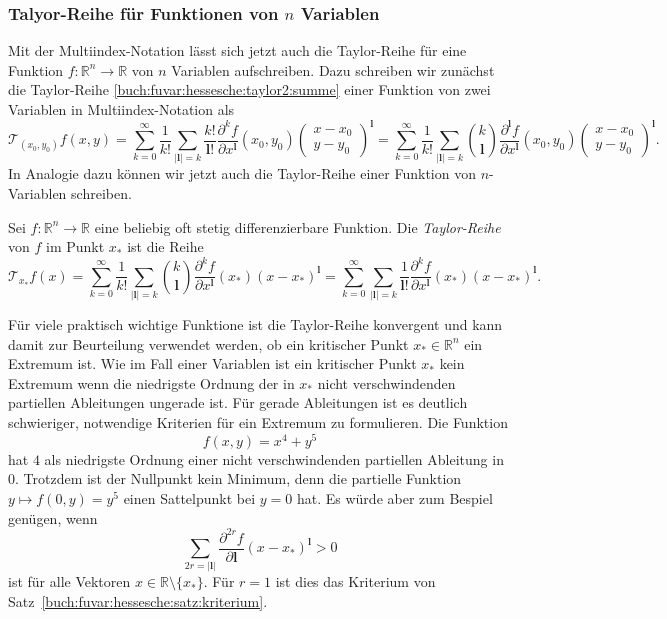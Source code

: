 \subsubsection{Talyor-Reihe für Funktionen von $n$ Variablen}
Mit der Multiindex-Notation lässt sich jetzt auch die Taylor-Reihe
für eine Funktion $f\colon\mathbb{R}^n\to\mathbb{R}$ von $n$ Variablen
aufschreiben.
Dazu schreiben wir zunächst die Taylor-Reihe
\eqref{buch:fuvar:hessesche:taylor2:summe}
einer Funktion von zwei Variablen in Multiindex-Notation als
\[
\mathscr{T}_{(x_0,y_0)}f(x,y)
=
\sum_{k=0}^\infty
\frac{1}{k!}
\sum_{|\mathbf{l}|=k}
\frac{k!}{\mathbf{l}!}
\frac{\partial^k f}{\partial x^{\mathbf{l}}}
(x_0,y_0)
\begin{pmatrix}
x-x_0\\
y-y_0
\end{pmatrix}^{\mathbf{l}}
=
\sum_{k=0}^\infty
\frac{1}{k!}
\sum_{|\mathbf{l}|=k}
\binom{k}{\mathbf{l}}
\frac{\partial^{\mathbf{l}} f}{\partial x^{\mathbf{l}}}(x_0,y_0)
\begin{pmatrix}
x-x_0\\
y-y_0
\end{pmatrix}^{\mathbf{l}}.
\]
In Analogie dazu können wir jetzt auch die Taylor-Reihe einer Funktion
von $n$-Variablen schreiben.

\begin{definition}
Sei $f\colon\mathbb{R}^n\to\mathbb{R}$ eine beliebig oft stetig
differenzierbare Funktion.
Die {\em Taylor-Reihe} von $f$ im Punkt $x_*$ ist die Reihe
\[
\mathscr{T}_{x_*} f(x)
=
\sum_{k=0}^\infty
\frac{1}{k!}
\sum_{|\mathbf{l}|=k}
\binom{k}{\mathbf{l}}
\frac{\partial^k f}{\partial x^{\mathbf{l}}}(x_*) (x-x_*)^{\mathbf{l}}
=
\sum_{k=0}^\infty
\sum_{|\mathbf{l}|=k}
\frac{1}{\mathbf{l}!}
\frac{\partial^k f}{\partial x^{\mathbf{l}}}(x_*) (x-x_*)^{\mathbf{l}}.
\]
\end{definition}

Für viele praktisch wichtige Funktione ist die Taylor-Reihe konvergent
und kann damit zur Beurteilung verwendet werden, ob ein kritischer Punkt
$x_*\in\mathbb{R}^n$ ein Extremum ist.
Wie im Fall einer Variablen ist ein kritischer Punkt $x_*$ kein Extremum
wenn die niedrigste Ordnung der in $x_*$ nicht verschwindenden partiellen
Ableitungen ungerade ist.
Für gerade Ableitungen ist es deutlich schwieriger, notwendige Kriterien
für ein Extremum zu formulieren.
Die Funktion
\[
f(x,y)
=
x^4 + y^5
\]
hat $4$ als niedrigste Ordnung einer nicht verschwindenden partiellen
Ableitung in $0$.
Trotzdem ist der Nullpunkt kein Minimum, denn die partielle Funktion
$y\mapsto f(0,y)=y^5$ einen Sattelpunkt bei $y=0$ hat.
Es würde aber zum Bespiel genügen, wenn
\[
\sum_{2r=|\mathbf{l}|}
\frac{\partial^{2r}f}{\partial \mathbf{l}}
(x-x_*)^{\mathbf{l}}
>
0
\]
ist für alle Vektoren $x\in\mathbb{R}\setminus\{x_*\}$.
Für $r=1$ ist dies das Kriterium von
Satz~\ref{buch:fuvar:hessesche:satz:kriterium}.



